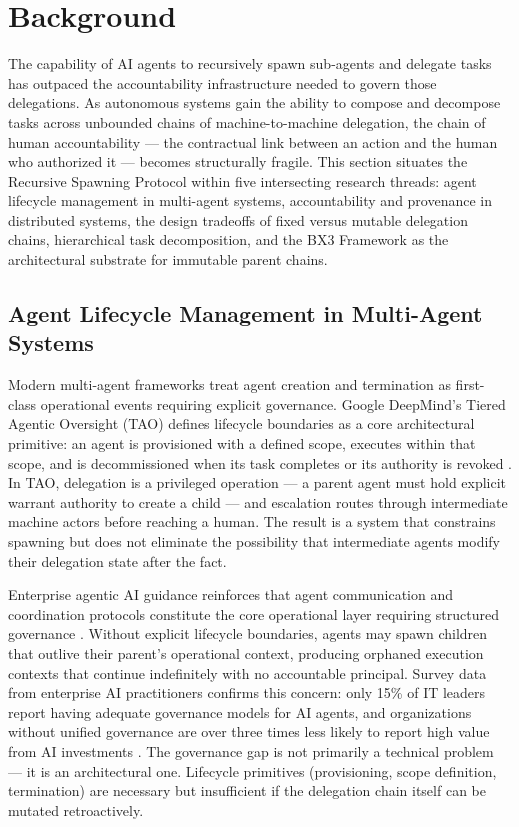 \section{Background}
\label{sec:background}

The capability of AI agents to recursively spawn sub-agents and delegate tasks has outpaced the accountability infrastructure needed to govern those delegations. As autonomous systems gain the ability to compose and decompose tasks across unbounded chains of machine-to-machine delegation, the chain of human accountability — the contractual link between an action and the human who authorized it — becomes structurally fragile. This section situates the Recursive Spawning Protocol within five intersecting research threads: agent lifecycle management in multi-agent systems, accountability and provenance in distributed systems, the design tradeoffs of fixed versus mutable delegation chains, hierarchical task decomposition, and the BX3 Framework as the architectural substrate for immutable parent chains.

\subsection{Agent Lifecycle Management in Multi-Agent Systems}
\label{sec:lifecycle-management}

Modern multi-agent frameworks treat agent creation and termination as first-class operational events requiring explicit governance. Google DeepMind's Tiered Agentic Oversight (TAO) defines lifecycle boundaries as a core architectural primitive: an agent is provisioned with a defined scope, executes within that scope, and is decommissioned when its task completes or its authority is revoked \cite{tao2025}. In TAO, delegation is a privileged operation — a parent agent must hold explicit warrant authority to create a child — and escalation routes through intermediate machine actors before reaching a human. The result is a system that constrains spawning but does not eliminate the possibility that intermediate agents modify their delegation state after the fact.

Enterprise agentic AI guidance reinforces that agent communication and coordination protocols constitute the core operational layer requiring structured governance \cite{enterprise2025}. Without explicit lifecycle boundaries, agents may spawn children that outlive their parent's operational context, producing orphaned execution contexts that continue indefinitely with no accountable principal. Survey data from enterprise AI practitioners confirms this concern: only 15\% of IT leaders report having adequate governance models for AI agents, and organizations without unified governance are over three times less likely to report high value from AI investments \cite{kore2025}. The governance gap is not primarily a technical problem — it is an architectural one. Lifecycle primitives (provisioning, scope definition, termination) are necessary but insufficient if the delegation chain itself can be mutated retroactively.

